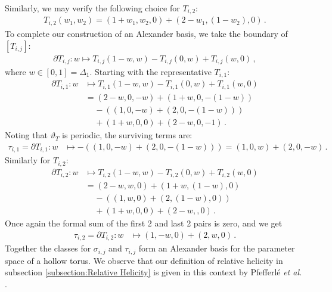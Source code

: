 \documentclass[11pt]{article}
\theoremstyle{plain}
\theoremstyle{definition}
\theoremstyle{remark}
\begin{document}
Similarly, we may verify the following choice for \(T_{i,2}\):
\begin{align*}
    T_{i,2} (w_1, w_2) = ( 1 + w_1,       w_2  , 0  ) + ( 2 - w_1,      (1-w_2) , 0   ) \, . 
\end{align*}
To complete our construction of an Alexander basis, we take the boundary of \([T_{i, j}]\):
\begin{align*}
    \partial T_{i, j}  
     : w \mapsto  T_{i, j} ( 1-w, w ) - T_{i, j} ( 0, w ) + T_{i, j} ( w, 0 ) \, ,
\end{align*}
where \(w \in [0,1] =  \Delta_1\). Starting with the representative \(T_{i,1}\):
\begin{align*}
    \partial T_{i,1} : w &\mapsto   T_{i,1} ( 1-w, w ) - T_{i,1} ( 0, w ) + T_{i,1} ( w, 0 ) \\
     &=  ( 2 - w, 0, -     w    ) + ( 1  + w, 0, -    (1-w)    ) \\
     & \; \; \; \; - (( 1 , 0, -     w    ) + ( 2 , 0, -    (1-w)    ) ) \\
     & \; \; \; \; + ( 1 + w, 0, 0   ) + ( 2 - w, 0, - 1       ) \, .
\end{align*}
Noting that \(\vartheta_T\) is periodic, the surviving terms are:
\begin{align*}
    \tau_{i,1} = \partial T_{i,1} : w &\mapsto   - (( 1 , 0, -     w    ) + ( 2 , 0, -    (1-w)    )) = ( 1 , 0,     w    )  + ( 2 , 0, -    w    )\, .
\end{align*}
Similarly for \(T_{i,2}\):
\begin{align*}
    \partial T_{i,2} : w &\mapsto   T_{i,2} ( 1-w, w ) - T_{i,2} ( 0, w ) + T_{i,2} ( w, 0 ) \\
     &=  ( 2 - w,       w ,0   ) + ( 1  + w,      (1-w)  ,0  ) \\
     & \; \; \; \; - (( 1 ,       w  ,0  ) + ( 2 ,      (1-w)  ,0  ) ) \\
     & \; \; \; \; + ( 1 + w,  0  ,0 ) + ( 2 - w,       ,0   ) \, .
\end{align*}
Once again the formal sum of the first 2 and last 2 pairs is zero, and we get
\begin{align*}
    \tau_{i,2} = \partial T_{i,2} : w &\mapsto   ( 1 ,   -     w  ,0  ) + ( 2 ,      w  ,0  )        \, .
\end{align*}
Together the classes for \(\sigma_{i,j}\) and \(\tau_{i,j}\) form an Alexander basis for the parameter space of a hollow torus. We observe that our definition of relative helicity in subsection \ref{subsection:Relative Helicity} is given in this context by Pfefferl\'e \emph{et al.} \cite{Gauge_freedom}.
 
\end{document}
